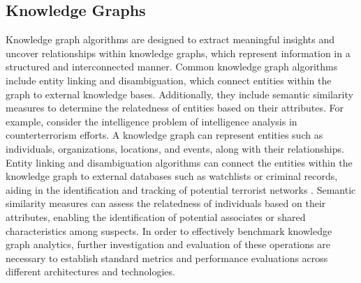 \documentclass[letterpaper, 10pt]{article}
\begin{document}
\begin{multicols}{2}
        \subsection{Knowledge Graphs}\label{section:knowledgeGraphs}
            Knowledge graph algorithms are designed to extract meaningful insights and uncover relationships within knowledge graphs, which represent information in a structured and interconnected manner. Common knowledge graph algorithms include entity linking and disambiguation, which connect entities within the graph to external knowledge bases. Additionally, they include semantic similarity measures to determine the relatedness of entities based on their attributes. For example, consider the intelligence problem of intelligence analysis in counterterrorism efforts. A knowledge graph can represent entities such as individuals, organizations, locations, and events, along with their relationships. Entity linking and disambiguation algorithms can connect the entities within the knowledge graph to external databases such as watchlists or criminal records, aiding in the identification and tracking of potential terrorist networks . Semantic similarity measures can assess the relatedness of individuals based on their attributes, enabling the identification of potential associates or shared characteristics among suspects. In order to effectively benchmark knowledge graph analytics, further investigation and evaluation of these operations are necessary to establish standard metrics and performance evaluations across different architectures and technologies.
            

\end{multicols}
\end{document}
